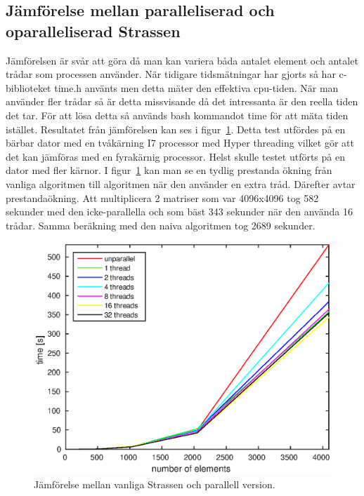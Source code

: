 \subsection{Jämförelse mellan paralleliserad och oparalleliserad Strassen}
Jämförelsen är svår att göra då man kan variera båda antalet element och antalet trådar som processen använder. När tidigare tidsmätningar har gjorts så har c-biblioteket time.h använts men detta mäter den effektiva cpu-tiden. När man använder fler trådar så är detta missvisande då det intressanta är den reella tiden det tar. För att lösa detta så används bash kommandot time för att mäta tiden istället. Resultatet från jämförelsen kan ses i figur~\ref{fig:threads}. Detta test utfördes på en bärbar dator med en tvåkärning I7 processor med Hyper threading vilket gör att det kan jämföras med en fyrakärnig processor. Helst skulle testet utförts på en dator med fler kärnor. I figur~\ref{fig:threads} kan man se en tydlig prestanda ökning från vanliga algoritmen till algoritmen när den använder en extra tråd. Därefter avtar prestandaökning. Att multiplicera 2 matriser som var 4096x4096 tog 582 sekunder med den icke-parallella och som bäst 343 sekunder när den använda 16 trådar. Samma beräkning med den naiva algoritmen tog 2689 sekunder. 

\begin{figure}[H]
	\begin{center}
		\includegraphics[scale=0.6]{martin-tex/threads_test.eps}
	\end{center}
	\caption{Jämförelse mellan vanliga Strassen och parallell version.}
	\label{fig:threads}
\end{figure}


